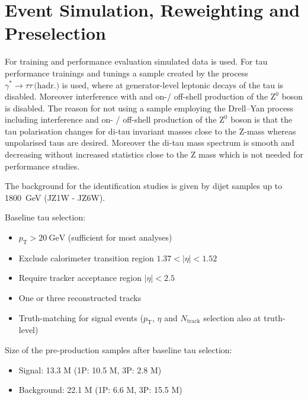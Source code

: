 \section{Event Simulation, Reweighting and Preselection}
\label{sec:bdt_eventsim}

For training and performance evaluation simulated data is used. For tau
performance trainings and tunings a sample created by the process
$\gamma^* \rightarrow \tau \tau \, \text{(hadr.)}$ is used, where at
generator-level leptonic decays of the tau is disabled. Moreover interference
with and on-/ off-shell production of the $\mathrm{Z}^0$ boson is disabled. The
reason for not using a sample employing the Drell--Yan process including
interference and on- / off-shell production of the $\mathrm{Z}^0$ boson is that
the tau polarisation changes for di-tau invariant masses close to the
$\mathrm{Z}$-mass whereas unpolarised taus are desired. Moreover the di-tau mass
spectrum is smooth and decreasing without increased statistics close to the
$\mathrm{Z}$ mass which is not needed for performance studies.

 The background for the identification studies is given by
dijet samples up to \SI{1800}{\giga\electronvolt} (JZ1W - JZ6W). 

Baseline tau selection:
\begin{itemize}
\item $p_\text{T} > \SI{20}{\giga\electronvolt}$ (sufficient for most analyses)
\item Exclude calorimeter transition region $1.37 < |\eta| < 1.52$
\item Require tracker acceptance region $|\eta| < 2.5$
\item One or three reconstructed tracks
\item Truth-matching for signal events ($p_\text{T}$, $\eta$ and
  $N_\text{track}$ selection also at truth-level)
\end{itemize}

Size of the pre-production samples after baseline tau selection:
\begin{itemize}
\item Signal: 13.3 M (1P: 10.5 M, 3P: 2.8 M)
\item Background: 22.1 M (1P: 6.6 M, 3P: 15.5 M)
\end{itemize}



